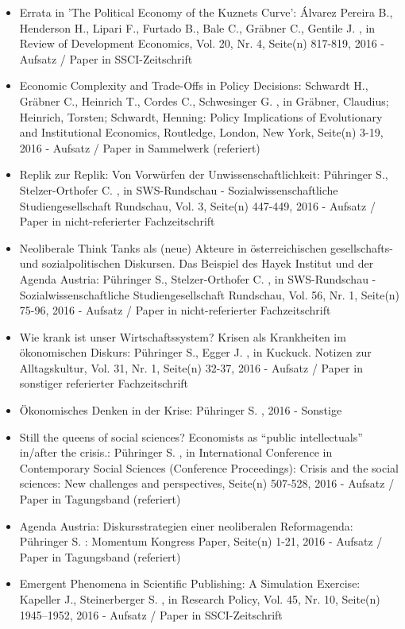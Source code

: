\begin{itemize}
	 \item Errata in 'The Political Economy of the Kuznets Curve': Álvarez Pereira B., Henderson H., Lipari F., Furtado B., Bale C., Gräbner C., Gentile J. , in Review of Development Economics, Vol. 20, Nr. 4, Seite(n) 817-819, 2016 - Aufsatz / Paper in SSCI-Zeitschrift
	 \item Economic Complexity and Trade-Offs in Policy Decisions: Schwardt H., Gräbner C., Heinrich T., Cordes C., Schwesinger G. , in Gräbner, Claudius; Heinrich, Torsten; Schwardt, Henning: Policy Implications of Evolutionary and Institutional Economics, Routledge, London, New York, Seite(n) 3-19, 2016 - Aufsatz / Paper in Sammelwerk (referiert)
	 \item Replik zur Replik: Von Vorwürfen der Unwissenschaftlichkeit: Pühringer S., Stelzer-Orthofer C. , in SWS-Rundschau - Sozialwissenschaftliche Studiengesellschaft Rundschau, Vol. 3, Seite(n) 447-449, 2016 - Aufsatz / Paper in nicht-referierter Fachzeitschrift
	 \item Neoliberale Think Tanks als (neue) Akteure in österreichischen gesellschafts- und sozialpolitischen Diskursen. Das Beispiel des Hayek Institut und der Agenda Austria: Pühringer S., Stelzer-Orthofer C. , in SWS-Rundschau - Sozialwissenschaftliche Studiengesellschaft Rundschau, Vol. 56, Nr. 1, Seite(n) 75-96, 2016 - Aufsatz / Paper in nicht-referierter Fachzeitschrift
	 \item Wie krank ist unser Wirtschaftssystem? Krisen als Krankheiten im ökonomischen Diskurs: Pühringer S., Egger J. , in Kuckuck. Notizen zur Alltagskultur, Vol. 31, Nr. 1, Seite(n) 32-37, 2016 - Aufsatz / Paper in sonstiger referierter Fachzeitschrift
	 \item Ökonomisches Denken in der Krise: Pühringer S. , 2016 - Sonstige
	 \item Still the queens of social sciences? Economists as “public intellectuals” in/after the crisis.: Pühringer S. , in International Conference in Contemporary Social Sciences (Conference Proceedings): Crisis and the social sciences: New challenges and perspectives, Seite(n) 507-528, 2016 - Aufsatz / Paper in Tagungsband (referiert)
	 \item Agenda Austria: Diskursstrategien einer neoliberalen Reformagenda: Pühringer S. : Momentum Kongress Paper, Seite(n) 1-21, 2016 - Aufsatz / Paper in Tagungsband (referiert)
	 \item Emergent Phenomena in Scientific Publishing: A Simulation Exercise: Kapeller J., Steinerberger S. , in Research Policy, Vol. 45, Nr. 10, Seite(n) 1945–1952, 2016 - Aufsatz / Paper in SSCI-Zeitschrift

\end{itemize}
